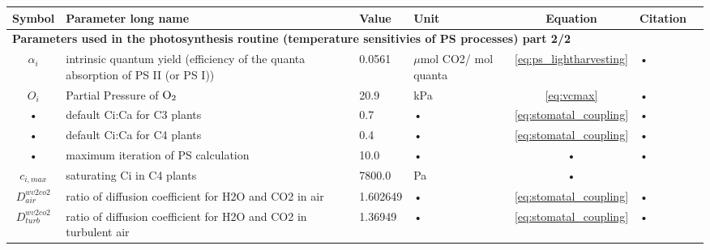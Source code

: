 \documentclass[11pt,oneside,openright,a4paper,fleqn]{book}  %
\makeatletter
\DeclareRobustCommand*\chem[1]
 {\ensuremath{%
   {\mathcode`\-="0200\mathcode`\=="003D%
    \ifx\f@series\testbx\mathbf{#1}\else\mathrm{#1}\fi}}}
\makeatother
\begin{document}
\begin{table}
\begin{tabularx}{\linewidth}{|c|X|l|l|c|l|c|} %
\hline 
Symbol & Parameter long name & Value & Unit & Equation & Citation \\
\hline 
\multicolumn{6}{l}{\bf Parameters used in the photosynthesis routine (temperature sensitivies of PS processes) part 2/2}\\
\hline
$\alpha_i$ & intrinsic quantum yield (efficiency of the quanta absorption of PS II (or PS I)) & 0.0561 & $\mu$mol CO2/ mol quanta & \ref{eq:ps_lightharvesting} & • \\
$O_i$ & Partial Pressure of \chem{O_2} & 20.9 & kPa & \ref{eq:vcmax} & • \\
• & default Ci:Ca for C3 plants & 0.7 & • & \ref{eq:stomatal_coupling} & • \\
• & default Ci:Ca for C4 plants & 0.4 & • & \ref{eq:stomatal_coupling} & • \\
• & maximum iteration of PS calculation & 10.0 & • & • & • \\
$c_{i,max}$ & saturating Ci in C4 plants & 7800.0 & Pa & • & \cite{Friend:2009tf} \\
$D_{air}^{wv2co2}$ & ratio of diffusion coefficient for H2O and CO2 in air & 1.602649 & • & \ref{eq:stomatal_coupling} & • \\
$D_{turb}^{wv2co2}$ & ratio of diffusion coefficient for H2O and CO2 in turbulent air & 1.36949 & • & \ref{eq:stomatal_coupling} & • \\
\hline 
\end{tabularx}
\end{table}
\end{document}
